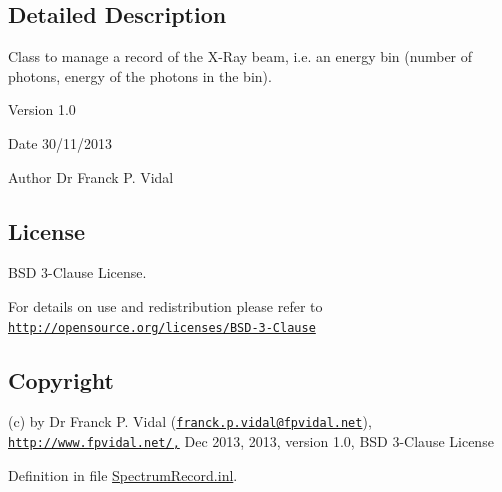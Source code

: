 \subsection{Detailed Description}
Class to manage a record of the X-\/Ray beam, i.e. an energy bin (number of photons, energy of the photons in the bin). \begin{DoxyVersion}{Version}
1.0
\end{DoxyVersion}
\begin{DoxyDate}{Date}
30/11/2013
\end{DoxyDate}
\begin{DoxyAuthor}{Author}
Dr Franck P. Vidal
\end{DoxyAuthor}
\hypertarget{_x_ray_renderer_8inl_License}{}\subsection{License}\label{_x_ray_renderer_8inl_License}
BSD 3-\/Clause License.

For details on use and redistribution please refer to \href{http://opensource.org/licenses/BSD-3-Clause}{\tt http://opensource.org/licenses/BSD-\/3-\/Clause}\hypertarget{_x_ray_renderer_8inl_Copyright}{}\subsection{Copyright}\label{_x_ray_renderer_8inl_Copyright}
(c) by Dr Franck P. Vidal (\href{mailto:franck.p.vidal@fpvidal.net}{\tt franck.p.vidal@fpvidal.net}), \href{http://www.fpvidal.net/,}{\tt http://www.fpvidal.net/,} Dec 2013, 2013, version 1.0, BSD 3-\/Clause License 

Definition in file \hyperlink{_spectrum_record_8inl_source}{SpectrumRecord.inl}.

